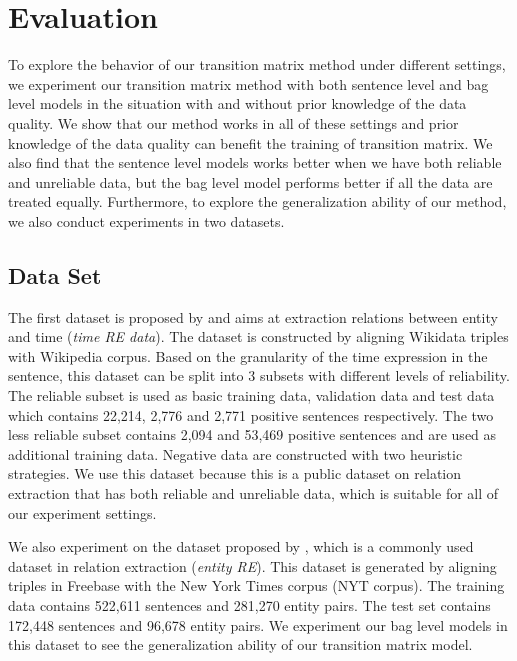 \section{Evaluation}
To explore the behavior of our transition matrix method under different settings, we experiment our transition matrix method with both sentence level and bag level models in the situation with and without prior knowledge of the data quality. We show that our method works in all of these settings and prior knowledge of the data quality can benefit the training of transition matrix. We also find that the sentence level models works better when we have both reliable and unreliable data, but the bag level model performs better if all the data are treated equally. Furthermore, to explore the generalization ability of our method, we also conduct experiments in two datasets.
\subsection{Data Set}
The first dataset is proposed by \cite{luo2016temporal} and aims at extraction relations between entity and time (\emph{time RE data}). The dataset is constructed by aligning Wikidata triples with Wikipedia corpus. Based on the granularity of the time expression in the sentence, this dataset can be split into 3 subsets with different levels of reliability. The reliable subset is used as basic training data, validation data and test data which contains 22,214, 2,776 and 2,771 positive sentences respectively. The two less reliable subset contains 2,094 and 53,469 positive sentences and are used as additional training data. Negative data are constructed with two heuristic strategies. We use this dataset because this is a public dataset on relation extraction that has both reliable and unreliable data, which is suitable for all of our experiment settings.

We also experiment on the dataset proposed by \cite{riedel2010modeling}, which is a commonly used dataset in relation extraction (\emph{entity RE}). This dataset is generated by aligning triples in Freebase with the New York Times corpus (NYT corpus). The training data contains 522,611 sentences and 281,270 entity pairs. The test set contains 172,448 sentences and 96,678 entity pairs. We experiment our bag level models in this dataset to see the generalization ability of our transition matrix model.

